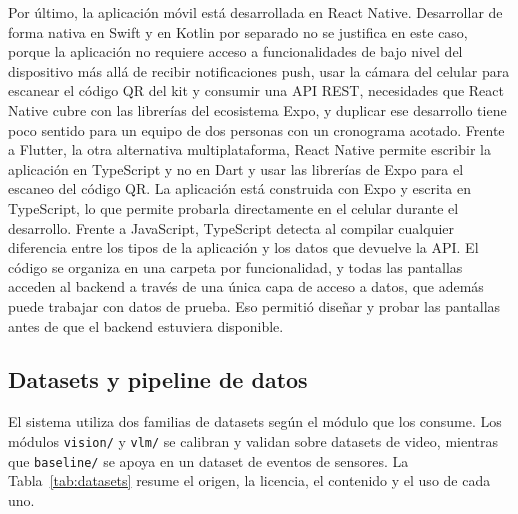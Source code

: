 Por último, la aplicación móvil está desarrollada en React Native.
Desarrollar de forma nativa en Swift y en Kotlin por separado no se justifica en este caso, porque la aplicación no requiere acceso a funcionalidades de bajo nivel del dispositivo más allá de recibir notificaciones push, usar la cámara del celular para escanear el código QR del kit y consumir una API REST, necesidades que React Native cubre con las librerías del ecosistema Expo, y duplicar ese desarrollo tiene poco sentido para un equipo de dos personas con un cronograma acotado.
Frente a Flutter, la otra alternativa multiplataforma, React Native permite escribir la aplicación en TypeScript y no en Dart y usar las librerías de Expo para el escaneo del código QR.
La aplicación está construida con Expo y escrita en TypeScript, lo que permite probarla directamente en el celular durante el desarrollo.
Frente a JavaScript, TypeScript detecta al compilar cualquier diferencia entre los tipos de la aplicación y los datos que devuelve la API.
El código se organiza en una carpeta por funcionalidad, y todas las pantallas acceden al backend a través de una única capa de acceso a datos, que además puede trabajar con datos de prueba.
Eso permitió diseñar y probar las pantallas antes de que el backend estuviera disponible.

\subsection{Datasets y pipeline de datos}
\label{sec:datasets}

El sistema utiliza dos familias de datasets según el módulo que los consume.
Los módulos \texttt{vision/} y \texttt{vlm/} se calibran y validan sobre datasets de video, mientras que \texttt{baseline/} se apoya en un dataset de eventos de sensores.
La Tabla~\ref{tab:datasets} resume el origen, la licencia, el contenido y el uso de cada uno.


